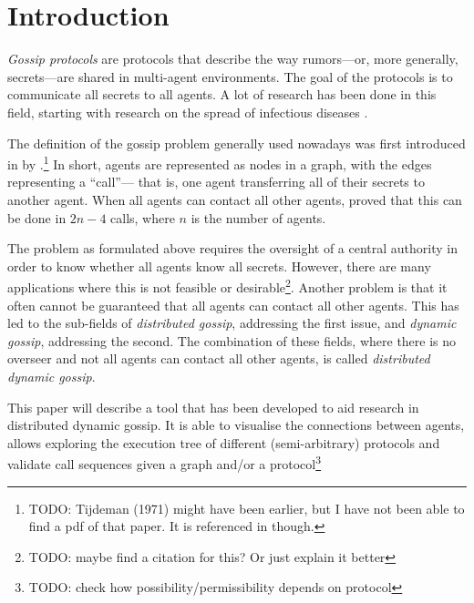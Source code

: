 
\section{Introduction}\label{sec:introduction}

\textit{Gossip protocols} are protocols that describe the way rumors---or, more generally, secrets---are shared in multi-agent environments.
The goal of the protocols is to communicate all secrets to all agents.
A lot of research has been done in this field, 
starting with research on the spread of infectious diseases \parencite{kermack_contribution_1927}.

The definition of the gossip problem generally used nowadays was first introduced in \citeyear{hajnal_cure_1972} by \citeauthor{hajnal_cure_1972}.\footnote{TODO: Tijdeman (1971) might have been earlier, but I have not been able to find a pdf of that paper. It is referenced in \Textcite{van_ditmarsch_dynamic_2018} though.}
In short, agents are represented as nodes in a graph, with the edges representing a ``call''---%
that is, one agent transferring all of their secrets to another agent.
When all agents can contact all other agents, \citeauthor{hajnal_cure_1972} proved that this can be done in \(2n-4\) calls, where \(n\) is the number of agents.

The problem as formulated above requires the oversight of a central authority in order to know whether all agents know all secrets.
However, there are many applications where this is not feasible or desirable\footnote{TODO: maybe find a citation for this? Or just explain it better}.
Another problem is that it often cannot be guaranteed that all agents can contact all other agents.
This has led to the sub-fields of \textit{distributed gossip}, addressing the first issue, and \textit{dynamic gossip}, addressing the second.
The combination of these fields, where there is no overseer and not all agents can contact all other agents, is called \textit{distributed dynamic gossip}.


This paper will describe a tool that has been developed to aid research in distributed dynamic gossip.
It is able to visualise the connections between agents, allows exploring the execution tree of different (semi-arbitrary) protocols and validate call sequences given a graph and/or a protocol\footnote{TODO: check how possibility/permissibility depends on protocol}



